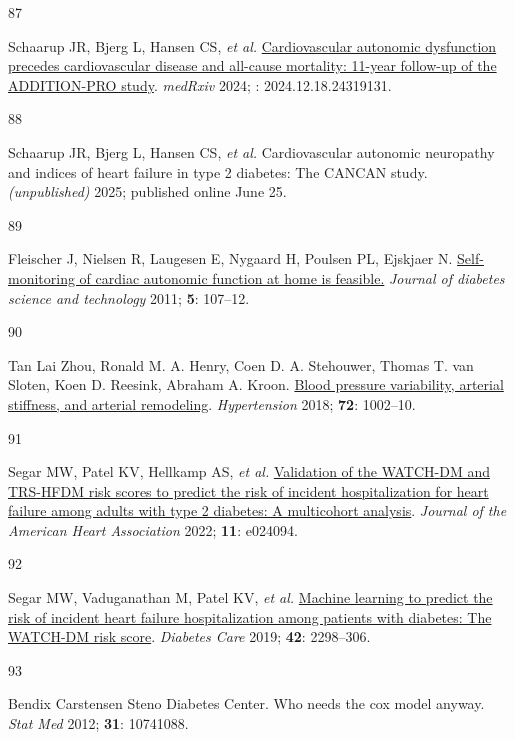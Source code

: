 \documentclass[
  a4paper,
  headsepline=true,
  open=left]{scrbook}
\newlength{\cslhangindent}
\newlength{\csllabelwidth}
\newlength{\cslentryspacingunit} %
\newenvironment{CSLReferences}[2] %
 {%
  \setlength{\parindent}{0pt}
  \ifodd #1
  \let\oldpar\par
  \def\par{\hangindent=\cslhangindent\oldpar}
  \fi
  \setlength{\parskip}{#2\cslentryspacingunit}
 }%
 {}
\newcommand{\CSLLeftMargin}[1]{\parbox[t]{\csllabelwidth}{#1}}
\newcommand{\CSLRightInline}[1]{\parbox[t]{\linewidth - \csllabelwidth}{#1}\break}
\begin{document}
\begin{CSLReferences}{0}{0}
\leavevmode{}%
\CSLLeftMargin{87 }%
\CSLRightInline{Schaarup JR, Bjerg L, Hansen CS, \emph{et al.}
\href{https://doi.org/10.1101/2024.12.18.24319131}{Cardiovascular
autonomic dysfunction precedes cardiovascular disease and all-cause
mortality: 11-year follow-up of the ADDITION-PRO study}. \emph{medRxiv}
2024; : 2024.12.18.24319131.}

\leavevmode{}%
\CSLLeftMargin{88 }%
\CSLRightInline{Schaarup JR, Bjerg L, Hansen CS, \emph{et al.}
Cardiovascular autonomic neuropathy and indices of heart failure in type
2 diabetes: The CANCAN study. \emph{(unpublished)} 2025; published
online June 25.}

\leavevmode{}%
\CSLLeftMargin{89 }%
\CSLRightInline{Fleischer J, Nielsen R, Laugesen E, Nygaard H, Poulsen
PL, Ejskjaer N.
\href{https://doi.org/10.1177/193229681100500115}{Self-monitoring of
cardiac autonomic function at home is feasible.} \emph{Journal of
diabetes science and technology} 2011; \textbf{5}: 107--12.}

\leavevmode{}%
\CSLLeftMargin{90 }%
\CSLRightInline{Tan Lai Zhou, Ronald M. A. Henry, Coen D. A. Stehouwer,
Thomas T. van Sloten, Koen D. Reesink, Abraham A. Kroon.
\href{https://doi.org/doi:10.1161/HYPERTENSIONAHA.118.11325}{Blood
pressure variability, arterial stiffness, and arterial remodeling}.
\emph{Hypertension} 2018; \textbf{72}: 1002--10.}

\leavevmode{}%
\CSLLeftMargin{91 }%
\CSLRightInline{Segar MW, Patel KV, Hellkamp AS, \emph{et al.}
\href{https://doi.org/10.1161/JAHA.121.024094}{Validation of the
WATCH{-}DM and TRS{-}HFDM risk scores to predict the risk of incident
hospitalization for heart failure among adults with type 2 diabetes: A
multicohort analysis}. \emph{Journal of the American Heart Association}
2022; \textbf{11}: e024094.}

\leavevmode{}%
\CSLLeftMargin{92 }%
\CSLRightInline{Segar MW, Vaduganathan M, Patel KV, \emph{et al.}
\href{https://doi.org/10.2337/dc19-0587}{Machine learning to predict the
risk of incident heart failure hospitalization among patients with
diabetes: The WATCH-DM risk score}. \emph{Diabetes Care} 2019;
\textbf{42}: 2298--306.}

\leavevmode{}%
\CSLLeftMargin{93 }%
\CSLRightInline{Bendix Carstensen Steno Diabetes Center. Who needs the
cox model anyway. \emph{Stat Med} 2012; \textbf{31}: 10741088.}


\end{CSLReferences}
\end{document}
